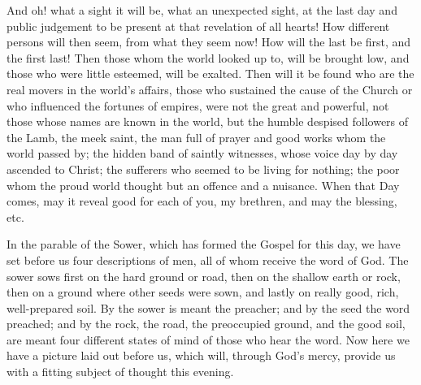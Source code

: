 And oh! what a sight it will be, what an
unexpected sight, at the last day and public judgement to be present
at that revelation of all hearts! How different persons will then
seem, from what they seem now! How will the last be first, and the
first last! Then those whom the world looked up to, will be brought
low, and those who were little esteemed, will be exalted. Then will it
be found who are the real movers in the world's affairs, those who
sustained the cause of the Church or who influenced the fortunes of
empires, were not the great and powerful, not those whose names are
known in the world, but the humble despised followers of the Lamb, the
meek saint, the man full of prayer and good works whom the world
passed by; the hidden band of saintly witnesses, whose voice day by
day ascended to Christ; the sufferers who seemed to be living for
nothing; the poor whom the proud world thought but an offence and a
nuisance. When that Day comes, may it reveal good for each of you, my
brethren, and may the blessing, etc.



In the parable of the Sower, which has
formed the Gospel for this day, we have set before us four
descriptions of men, all of whom receive the word of God. The sower
sows first on the hard ground or road, then on the shallow earth or
rock, then on a ground where other seeds were sown, and lastly on
really good, rich, well-prepared soil. By the sower is meant the
preacher; and by the seed the word preached; and by the rock, the
road, the preoccupied ground, and the good soil, are meant four
different states of mind of those who hear the word. Now here we have
a picture laid out before us, which will, through God's mercy, provide
us with a fitting subject of thought this evening.

